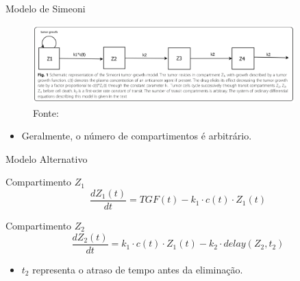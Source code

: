 \documentclass{beamer}
\begin{document}
\begin{frame}{Modelo de Simeoni}

    \begin{figure}
        \centering
        \includegraphics[width=0.9\textwidth]{pic/simeoni.png}
        \hspace*{15pt}\hbox{\scriptsize Fonte:}\\
        \label{fig:map1}
    \end{figure}

    \begin{itemize}
        \setlength{\itemsep}{10pt}
        \item Geralmente, o número de compartimentos é arbitrário.
    \end{itemize}
    
\end{frame}

\begin{frame}{Modelo Alternativo}
    
    \begin{block}{Compartimento \(Z_1\)}
        \begin{equation*}
            \frac{dZ_1(t)}{dt} = TGF(t) - k_1 \cdot c(t) \cdot Z_1(t)
        \end{equation*}
    \end{block}

    \begin{block}{Compartimento \(Z_2\)}
        \begin{equation*}
            \frac{dZ_2(t)}{dt} = k_1 \cdot c(t) \cdot Z_1(t) - k_2 \cdot delay(Z_2, t_2)
        \end{equation*}
    \end{block}

    \begin{itemize}
        \setlength{\itemsep}{10pt}
        \item \(t_2\) representa o atraso de tempo antes da eliminação.
    \end{itemize}
    
\end{frame}
\end{document}
